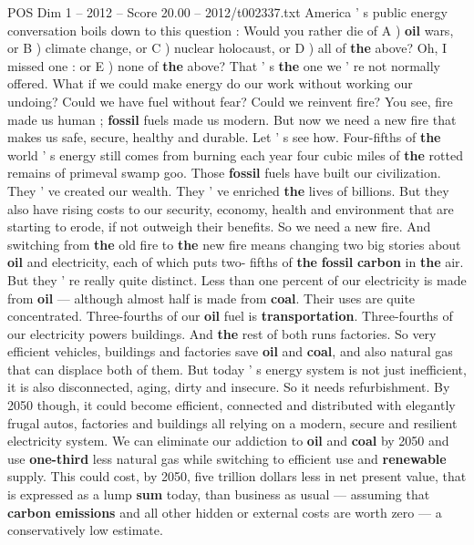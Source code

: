 \begin{textsample}{POS Dim 1 – 2012 – Score 20.00 – 2012/t002337.txt}  \label{ex:f1_pos_036}
America ' s public energy conversation boils down to this question : Would you rather die of A ) \textbf{oil} wars, or B ) climate change, or C ) nuclear holocaust, or D ) all of \textbf{the} above?
Oh, I missed one : or E ) none of \textbf{the} above?
That ' s \textbf{the} one we ' re not normally offered.
What if we could make energy do our work without working our undoing?
Could we have fuel without fear?
Could we reinvent fire?
You see, fire made us human ; \textbf{fossil} fuels made us modern.
But now we need a new fire that makes us safe, secure, healthy and durable.
Let ' s see how.
Four-fifths of \textbf{the} world ' s energy still comes from burning each year four cubic miles of \textbf{the} rotted remains of primeval swamp goo.
Those \textbf{fossil} fuels have built our civilization.
They ' ve created our wealth.
They ' ve enriched \textbf{the} lives of billions.
But they also have rising costs to our security, economy, health and environment that are starting to erode, if not outweigh their benefits.
So we need a new fire.
And switching from \textbf{the} old fire to \textbf{the} new fire means changing two big stories about \textbf{oil} and electricity, each of which puts two- fifths of \textbf{the} \textbf{fossil} \textbf{carbon} in \textbf{the} air.
But they ' re really quite distinct.
Less than one percent of our electricity is made from \textbf{oil} — although almost half is made from \textbf{coal}.
Their uses are quite concentrated.
Three-fourths of our \textbf{oil} fuel is \textbf{transportation}.
Three-fourths of our electricity powers buildings.
And \textbf{the} rest of both runs factories.
So very efficient vehicles, buildings and factories save \textbf{oil} and \textbf{coal}, and also natural gas that can displace both of them.
But today ' s energy system is not just inefficient, it is also disconnected, aging, dirty and insecure.
So it needs refurbishment.
By 2050 though, it could become efficient, connected and distributed with elegantly frugal autos, factories and buildings all relying on a modern, secure and resilient electricity system.
We can eliminate our addiction to \textbf{oil} and \textbf{coal} by 2050 and use \textbf{one-third} less natural gas while switching to efficient use and \textbf{renewable} supply.
This could cost, by 2050, five trillion dollars less in net present value, that is expressed as a lump \textbf{sum} today, than business as usual — assuming that \textbf{carbon} \textbf{emissions} and all other hidden or external costs are worth zero — a conservatively low estimate.

\end{textsample}
